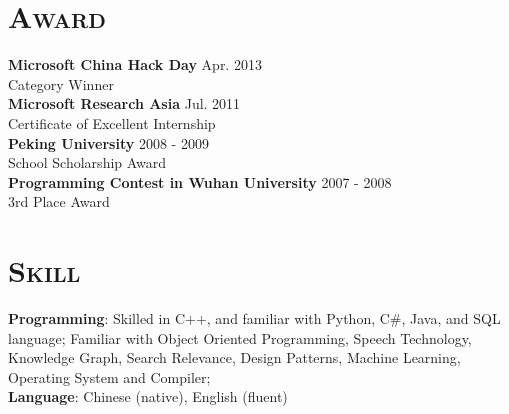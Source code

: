 \begin{resume}




\vspace*{-12pt}
\section{\textsc{Award}}
\textbf{Microsoft China Hack Day} \hfill Apr. 2013 \\
Category Winner\\
\newline
\textbf{Microsoft Research Asia} \hfill Jul. 2011 \\
Certificate of Excellent Internship\\
\newline
\textbf{Peking University} \hfill 2008 - 2009 \\
School Scholarship Award\\
\newline
\textbf{Programming Contest in Wuhan University} \hfill 2007 - 2008 \\
3rd Place Award\\

\vspace*{-12pt}
\section{\textsc{Skill}}
\textbf{Programming}: Skilled in C++, and familiar with Python, C\#, Java, and SQL language; Familiar with Object Oriented Programming, Speech Technology, Knowledge Graph, Search Relevance, Design Patterns, Machine Learning, Operating System and Compiler;  \\
\vspace*{-6pt}
\newline
\textbf{Language}: Chinese (native), English (fluent)



\end{resume}
